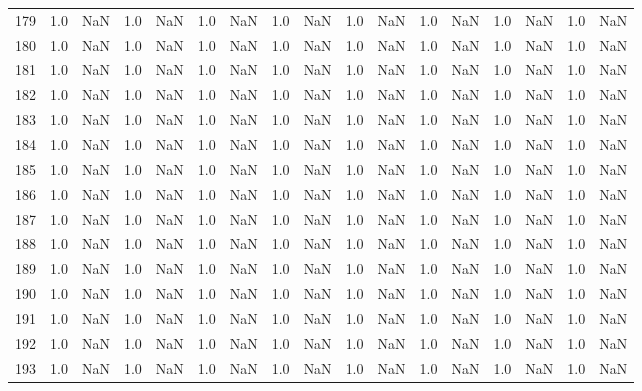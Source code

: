 \begin{tabular}{lrrrrrrrrrrrrrrrr}
    179 &  1.0 & NaN &   1.0 &   NaN &   1.0 &   NaN &   1.0 &   NaN &   1.0 &   NaN &   1.0 &   NaN &   1.0 &   NaN &   1.0 &   NaN \\
    180 &  1.0 & NaN &   1.0 &   NaN &   1.0 &   NaN &   1.0 &   NaN &   1.0 &   NaN &   1.0 &   NaN &   1.0 &   NaN &   1.0 &   NaN \\
    181 &  1.0 & NaN &   1.0 &   NaN &   1.0 &   NaN &   1.0 &   NaN &   1.0 &   NaN &   1.0 &   NaN &   1.0 &   NaN &   1.0 &   NaN \\
    182 &  1.0 & NaN &   1.0 &   NaN &   1.0 &   NaN &   1.0 &   NaN &   1.0 &   NaN &   1.0 &   NaN &   1.0 &   NaN &   1.0 &   NaN \\
    183 &  1.0 & NaN &   1.0 &   NaN &   1.0 &   NaN &   1.0 &   NaN &   1.0 &   NaN &   1.0 &   NaN &   1.0 &   NaN &   1.0 &   NaN \\
    184 &  1.0 & NaN &   1.0 &   NaN &   1.0 &   NaN &   1.0 &   NaN &   1.0 &   NaN &   1.0 &   NaN &   1.0 &   NaN &   1.0 &   NaN \\
    185 &  1.0 & NaN &   1.0 &   NaN &   1.0 &   NaN &   1.0 &   NaN &   1.0 &   NaN &   1.0 &   NaN &   1.0 &   NaN &   1.0 &   NaN \\
    186 &  1.0 & NaN &   1.0 &   NaN &   1.0 &   NaN &   1.0 &   NaN &   1.0 &   NaN &   1.0 &   NaN &   1.0 &   NaN &   1.0 &   NaN \\
    187 &  1.0 & NaN &   1.0 &   NaN &   1.0 &   NaN &   1.0 &   NaN &   1.0 &   NaN &   1.0 &   NaN &   1.0 &   NaN &   1.0 &   NaN \\
    188 &  1.0 & NaN &   1.0 &   NaN &   1.0 &   NaN &   1.0 &   NaN &   1.0 &   NaN &   1.0 &   NaN &   1.0 &   NaN &   1.0 &   NaN \\
    189 &  1.0 & NaN &   1.0 &   NaN &   1.0 &   NaN &   1.0 &   NaN &   1.0 &   NaN &   1.0 &   NaN &   1.0 &   NaN &   1.0 &   NaN \\
    190 &  1.0 & NaN &   1.0 &   NaN &   1.0 &   NaN &   1.0 &   NaN &   1.0 &   NaN &   1.0 &   NaN &   1.0 &   NaN &   1.0 &   NaN \\
    191 &  1.0 & NaN &   1.0 &   NaN &   1.0 &   NaN &   1.0 &   NaN &   1.0 &   NaN &   1.0 &   NaN &   1.0 &   NaN &   1.0 &   NaN \\
    192 &  1.0 & NaN &   1.0 &   NaN &   1.0 &   NaN &   1.0 &   NaN &   1.0 &   NaN &   1.0 &   NaN &   1.0 &   NaN &   1.0 &   NaN \\
    193 &  1.0 & NaN &   1.0 &   NaN &   1.0 &   NaN &   1.0 &   NaN &   1.0 &   NaN &   1.0 &   NaN &   1.0 &   NaN &   1.0 &   NaN \\

\end{tabular}
